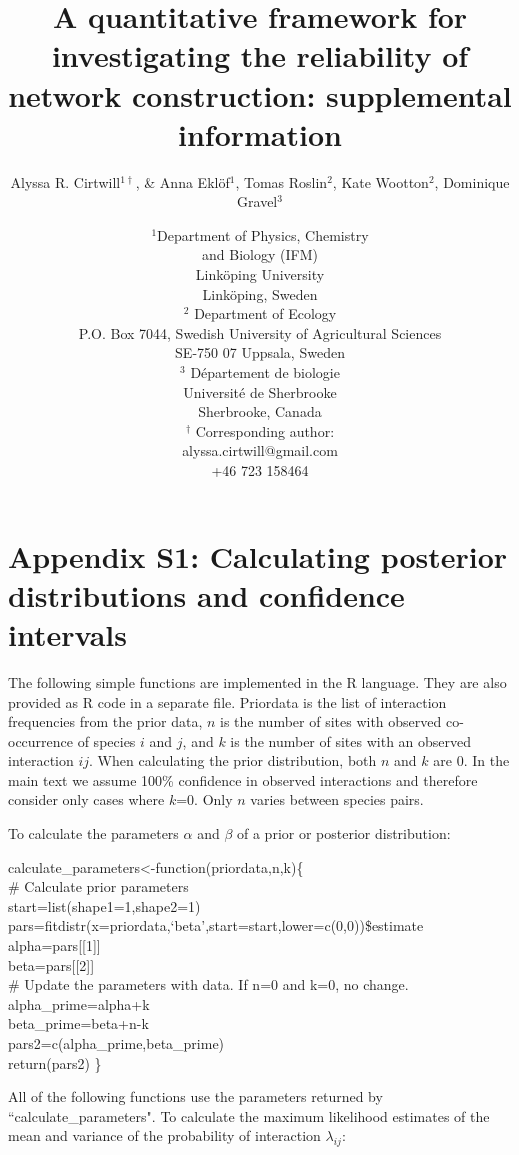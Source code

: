 \documentclass[12pt]{article}
\title{A quantitative framework for investigating the reliability of network construction: supplemental information}
\author{Alyssa R. Cirtwill$^{1\dagger}$, \&  Anna Ekl\"{o}f$^{1}$, Tomas Roslin$^{2}$, Kate Wootton$^{2}$, Dominique Gravel$^{3}$}
\date{\small$^1$Department of Physics, Chemistry\\ 
and Biology (IFM)\\ 
Link\"{o}ping University\\
Link\"{o}ping, Sweden\\
\medskip $^2$ Department of Ecology\\ P.O. Box 7044, Swedish University of Agricultural Sciences \\ SE-750 07 Uppsala, Sweden \\
\medskip$^3$ D\'{e}partement de biologie\\ 
Universit\'{e} de Sherbrooke\\ 
Sherbrooke, Canada\\ 
\medskip
$^\dagger$ Corresponding author:\\
alyssa.cirtwill@gmail.com\\
+46 723 158464\\
}
\begin{document}
 
\maketitle 
\raggedright
\setlength{\parindent}{15pt} 
\clearpage

\section*{Appendix S1: Calculating posterior distributions and confidence intervals}

  The following simple functions are implemented in the R language. They are 
  also provided as R code in a separate file.
  Priordata is the list of interaction frequencies from the prior 
  data, $n$ is the number of sites with observed co-occurrence of 
  species $i$ and $j$, and $k$ is the number of sites with an 
  observed interaction $ij$. When calculating the prior 
  distribution, both $n$ and $k$ are 0. In the main text we assume 100\%
  confidence in observed interactions and therefore consider only 
  cases where $k$=0. Only $n$ varies between species pairs.


  To calculate the parameters $\alpha$ and $\beta$ of a prior or 
  posterior distribution:

  \vspace{12pt}
  \begin{em}
  \noindent \hspace{2pt}calculate\_parameters\textless-function(priordata,n,k)\{\\
  \vspace{4pt}
    \# Calculate prior parameters\\
    start=list(shape1=1,shape2=1)\\
    pars=fitdistr(x=priordata,`beta',start=start,lower=c(0,0))\$estimate\\
    alpha=pars[[1]]\\
    beta=pars[[2]]\\
  \vspace{4pt}
    \# Update the parameters with data. If n=0 and k=0, no change.\\
    alpha\_prime=alpha+k\\
    beta\_prime=beta+n-k\\
    pars2=c(alpha\_prime,beta\_prime)\\
    return(pars2) \}
  \end{em}
  \vspace{12pt}


    All of the following functions use the parameters returned by 
    ``calculate\_parameters". To calculate the maximum likelihood estimates of 
    the mean and variance of the probability of interaction $\lambda_{ij}$:
\end{document}
